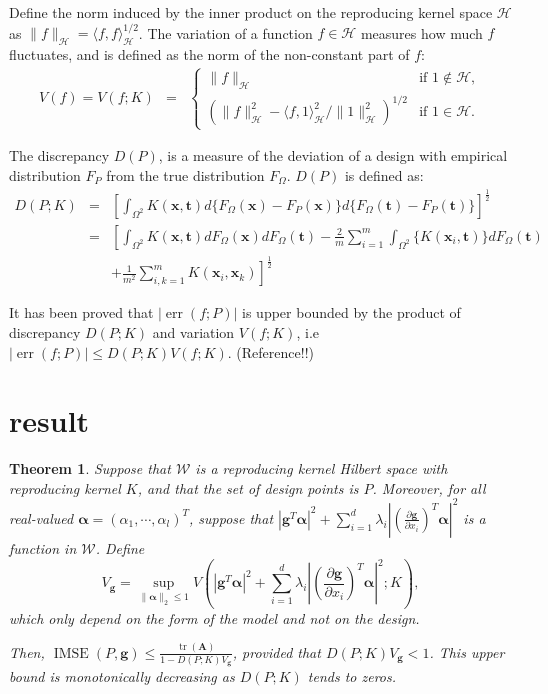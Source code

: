 \documentclass[preprint,12pt]{elsarticle}
\newtheorem{thm}{Theorem}
\DeclareMathOperator{\tr}{tr} \DeclareMathOperator{\err}{err}
\DeclareMathOperator{\IMSE}{IMSE}
\begin{document}
Define the norm induced by the inner product on the reproducing
kernel space $\mathcal{H}$ as $\|f\|_{\mathcal{H}}=\langle
f,f\rangle_{\mathcal{H}}^{1/2}$. The variation of a function
$f\in\mathcal{H}$ measures how much $f$ fluctuates, and is defined
as the norm of the non-constant part of $f$:
\begin{eqnarray*}
V(f)=V(f;K)&=&\left\{\begin{array} {ll} \|f\|_{\mathcal{H}}&\text{if} \,\,1\notin\mathcal{H},\\
\left(\|f\|^2_{\mathcal{H}}-\langle
f,1\rangle^2_{\mathcal{H}}/\|1\|^2_{\mathcal{H}}\right)^{1/2}&\text{if}\,\,
1\in\mathcal{H}.\end{array}\right.
\end{eqnarray*}

The discrepancy $D(P)$, is a measure of the deviation of a design
with empirical distribution $F_{P}$ from the true distribution
$F_{\Omega}$. $D(P)$ is defined as:
\begin{eqnarray*}
D(P;K)&=&\left[\int_{\Omega^2}K(\boldsymbol{x},\boldsymbol{t})d\{F_{\Omega}(\boldsymbol{x})-F_P(\boldsymbol{x})\}d\{F_{\Omega}(\boldsymbol{t})-F_P(\boldsymbol{t})\}\right]^{\frac{1}{2}}\\
&=&
\left[\int_{\Omega^2}K(\boldsymbol{x},\boldsymbol{t})dF_{\Omega}(\boldsymbol{x})dF_{\Omega}(\boldsymbol{t})-\frac{2}{m}\sum_{i=1}^m\int_{\Omega^2}\{K(\boldsymbol{x}_i,\boldsymbol{t})\}dF_{\Omega}(\boldsymbol{t})\right.\\
&&\left.+\frac{1}{m^2}\sum\limits_{i,k=1}^mK(\boldsymbol{x}_i,\boldsymbol{x}_k)\right]^{\frac{1}{2}}
\end{eqnarray*}

It has been proved that $|\err(f;P)|$ is upper bounded by the
product of discrepancy $D(P;K)$ and variation $V(f;K)$, i.e
$|\err(f;P)|\leq D(P;K)V(f;K)$. (Reference!!)


\section{result}

\begin{thm}\label{thm:unidesign}
Suppose that $\mathcal{W}$ is a reproducing kernel Hilbert space
with reproducing kernel $K$, and that the set of design points is
$P$. Moreover, for all real-valued
$\boldsymbol{\alpha}=(\alpha_1,\cdots,\alpha_l)^T$, suppose that
$|\boldsymbol{g}^T\boldsymbol{\alpha}|^2+\sum\limits_{i=1}^d\lambda_i\left|\left(\frac{\partial
\boldsymbol{g}}{\partial x_i}\right)^T\boldsymbol{\alpha}\right|^2$
is a function in $\mathcal{W}$. Define
$$V_{\boldsymbol{g}}=\sup_{\|\boldsymbol{\alpha}\|_2\leq 1}
V\left(|\boldsymbol{g}^T\boldsymbol{\alpha}|^2+\sum_{i=1}^d\lambda_i\left|\left(\frac{\partial
\boldsymbol{g}}{\partial
x_i}\right)^T\boldsymbol{\alpha}\right|^2;K\right),$$ which only
depend on the form of the model and not on the design.

Then, $\IMSE(P,\boldsymbol{g})\leq
\frac{\tr(\boldsymbol{A})}{1-D(P;K)V_{\boldsymbol{g}}}$, provided
that $D(P;K)V_{\boldsymbol{g}}<1$. This upper bound is monotonically
decreasing as $D(P;K)$ tends to zeros.


\end{thm}
\end{document}
